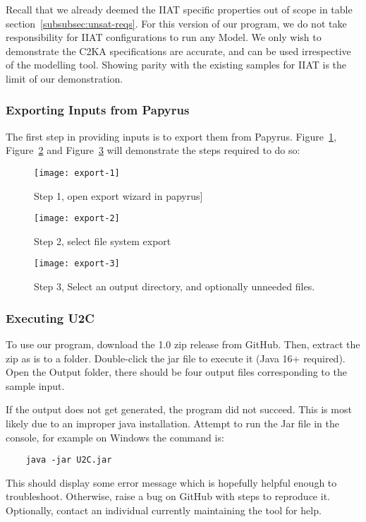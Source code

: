 Recall that we already deemed the IIAT specific properties out of scope in table section~\ref{subsubsec:unsat-reqs}.
For this version of our program, we do not take responsibility for IIAT configurations to run any Model.
We only wish to demonstrate the C2KA specifications are accurate, and can be used irrespective of the modelling tool.
Showing parity with the existing samples for IIAT is the limit of our demonstration.


\subsubsection{Exporting Inputs from Papyrus}
The first step in providing inputs is to export them from Papyrus.
Figure~\ref{fig:export-1}, Figure~\ref{fig:export-2} and Figure~\ref{fig:export-3} will demonstrate the steps required to do so:
\begin{figure}[h]
    \centering
    \texttt{[image: export-1]}
    \caption{Step 1, open export wizard in papyrus]}
    \label{fig:export-1}
\end{figure}
\begin{figure}[h]
    \centering
    \texttt{[image: export-2]}
    \caption{Step 2, select file system export}
    \label{fig:export-2}
\end{figure}
\begin{figure}[h]
    \centering
    \texttt{[image: export-3]}
    \caption{Step 3, Select an output directory, and optionally unneeded files.}
    \label{fig:export-3}
\end{figure}

\newpage
\subsubsection{Executing U2C}\label{subsubsec:exec}
To use our program, download the 1.0 zip release from GitHub. %
Then, extract the zip as is to a folder.
Double-click the jar file to execute it (Java 16+ required).
Open the Output folder, there should be four output files corresponding to the sample input.

If the output does not get generated, the program did not succeed.
This is most likely due to an improper java installation.
Attempt to run the Jar file in the console, for example on Windows the command is:
\begin{verbatim}
    java -jar U2C.jar
\end{verbatim}
This should display some error message which is hopefully helpful enough to troubleshoot.
Otherwise, raise a bug on GitHub with steps to reproduce it.
Optionally, contact an individual currently maintaining the tool for help.


